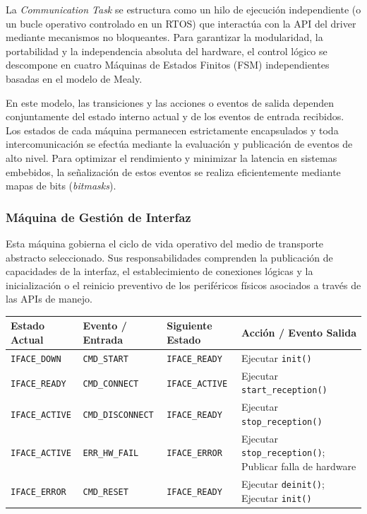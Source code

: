 La \textit{Communication Task} se estructura como un hilo de ejecución independiente (o un bucle operativo controlado en un RTOS) que interactúa con la API del driver mediante mecanismos no bloqueantes. Para garantizar la modularidad, la portabilidad y la independencia absoluta del hardware, el control lógico se descompone en cuatro Máquinas de Estados Finitos (FSM) independientes basadas en el modelo de Mealy.

En este modelo, las transiciones y las acciones o eventos de salida dependen conjuntamente del estado interno actual y de los eventos de entrada recibidos. Los estados de cada máquina permanecen estrictamente encapsulados y toda intercomunicación se efectúa mediante la evaluación y publicación de eventos de alto nivel. Para optimizar el rendimiento y minimizar la latencia en sistemas embebidos, la señalización de estos eventos se realiza eficientemente mediante mapas de bits (\textit{bitmasks}).

\subsubsection{Máquina de Gestión de Interfaz}
\label{subsubsec:fsm-gestion-interfaz}

Esta máquina gobierna el ciclo de vida operativo del medio de transporte abstracto seleccionado. Sus responsabilidades comprenden la publicación de capacidades de la interfaz, el establecimiento de conexiones lógicas y la inicialización o el reinicio preventivo de los periféricos físicos asociados a través de las APIs de manejo.

\begin{center}
\small
\begin{tabular}{llll}
\toprule
\textbf{Estado Actual} & \textbf{Evento / Entrada} & \textbf{Siguiente Estado} & \textbf{Acción / Evento Salida} \\
\midrule
\texttt{IFACE\_DOWN} & \texttt{CMD\_START} & \texttt{IFACE\_READY} & Ejecutar \texttt{init()} \\
\texttt{IFACE\_READY} & \texttt{CMD\_CONNECT} & \texttt{IFACE\_ACTIVE} & Ejecutar \texttt{start\_reception()} \\
\texttt{IFACE\_ACTIVE} & \texttt{CMD\_DISCONNECT} & \texttt{IFACE\_READY} & Ejecutar \texttt{stop\_reception()} \\
\texttt{IFACE\_ACTIVE} & \texttt{ERR\_HW\_FAIL} & \texttt{IFACE\_ERROR} & Ejecutar \texttt{stop\_reception()}; Publicar falla de hardware \\
\texttt{IFACE\_ERROR} & \texttt{CMD\_RESET} & \texttt{IFACE\_READY} & Ejecutar \texttt{deinit()}; Ejecutar \texttt{init()} \\
\bottomrule
\end{tabular}
\end{center}

